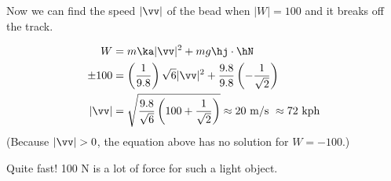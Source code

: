 \begin{solution}
Now we can find the speed $|\vv|$ of the bead when $|W|=100$ and it breaks off the track.

\begin{align*}
	W&=m\ka|\vv|^2+mg\hj\cdot\hN\\
	\pm 100 &=\left(\frac{1}{9.8} \right)\sqrt{6}|\vv|^2+\frac{9.8}{9.8}\left(-\frac{1}{\sqrt 2} \right)\\
	|\vv|&=\sqrt{\frac{9.8}{\sqrt6}\left(100+\frac{1}{\sqrt 2} \right)} \approx20~ \mathrm{m}/\mathrm{s}~\approx 72 ~\mathrm{kph}
	\end{align*}
(Because $|\vv|>0$, the equation above has no solution for $W=-100$.)

Quite fast! 100 N is a lot of force for such a light object.
\end{solution}


